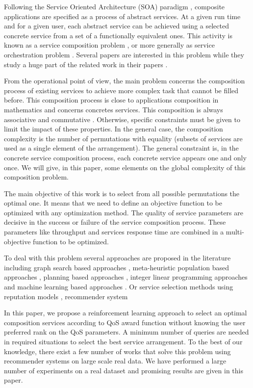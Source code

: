 \documentclass[10pt,journal,compsoc]{IEEEtran}
\begin{document}
Following  the Service Oriented Architecture (SOA) paradigm \cite{Alrifai:2010}, composite applications are specified as a process of abstract services. At a given run time and for a given user, each abstract service can be achieved using a selected concrete service from a set of a functionally equivalent ones. This activity is known as a service composition problem \cite{stelmach2013}, or more generally as service orchestration problem \cite{Papazoglou2007a}. Several papers are interested in this problem while they study a huge part of the related work in their papers \cite{Essaid2017,Zheng2015}. 

From the operational point of view, the main problem concerns the composition process of existing services to achieve more complex task that cannot be filled before. This composition process is close to applications composition in mathematics and concerns concretes services. This composition is always associative and commutative \cite{GABREL2015}. Otherwise, specific constraints must be given to limit the impact of these properties. In the general case, the composition complexity is the number of permutations with equality (subsets of services are used as a single element of the arrangement). The general constraint is, in the concrete service composition process, each concrete service appears one and only once. We will give, in this paper, some elements on the global complexity of this composition problem. 

The main objective of this work is to select from all possible permutations the optimal one.  It means that we need to define an objective function to be optimized with any optimization method. The quality of service parameters are decisive in the success or failure of the service composition process. These parameters like throughput and services response time are combined in a multi-objective function to be optimized.  

To deal with this problem several approaches are proposed in the literature including graph search based approaches \cite{deng2014,jiang2014,Rodriguez2016,Siebert2015}, meta-heuristic population based approaches \cite{Deng2017,Deng2016c,Chandra2016,Wu2016,Zheng2015}, planning based approaches \cite{chen2017,Zou2014}, integer linear programming approaches \cite{} and machine learning based approaches \cite{Deng2016s,Deng2016m,Rao2011,BenMabrouk2009}. Or service selection methods using reputation models \cite{Wang2007,Wang2011},  recommender system \cite{Manikrao2005,Liu2005}

In this paper, we propose a reinforcement learning approach to select an optimal composition services according to QoS award function without knowing the user preferred rank on the QoS parameters. A minimum number of queries are needed in required situations to select the best service arrangement. To the best of our knowledge, there exist a few number of works that solve this problem using recommender systems on large scale real data. We have performed a large number of experiments on a real dataset \cite{Zheng2014} and promising results are given in this paper.
\end{document}
